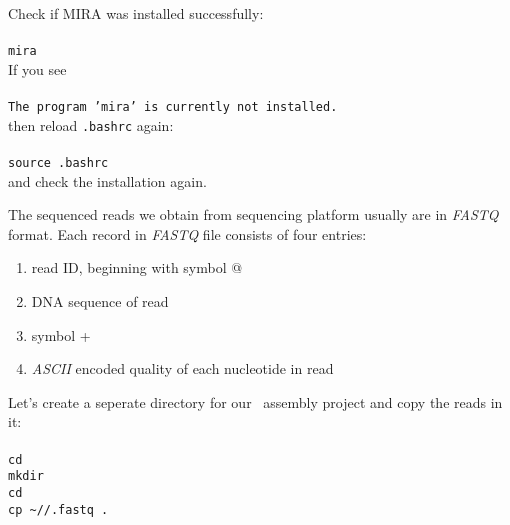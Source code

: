 Check if MIRA was installed successfully:\\~\\
\texttt{mira}\\

If you see\\~\\
\texttt{The program 'mira' is currently not installed.}\\

then reload \texttt{.bashrc} again:\\~\\
\texttt{source .bashrc}\\

and check the installation again.

The sequenced reads we obtain from sequencing platform usually are in \textit{FASTQ} format.
Each record in \textit{FASTQ} file consists of four entries:
\begin{enumerate}
  \item read ID, beginning with symbol @
  \item DNA sequence of read
  \item symbol +
  \item \textit{ASCII} encoded quality of each nucleotide in read
\end{enumerate}

Let's create a seperate directory for our \denovo~assembly project 
and copy the reads in it:\\~\\
\texttt{cd \workDir}\\
\texttt{mkdir \denovoDir}\\
\texttt{cd \denovoDir}\\
\texttt{cp \textasciitilde/\dataDir/\denovoReads.fastq~.}\\

